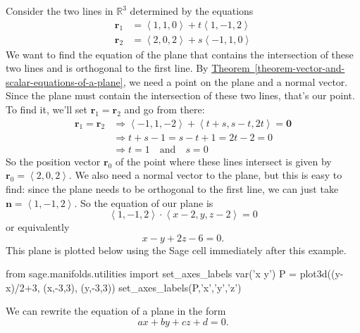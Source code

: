 \documentclass[10pt,]{book}
\theoremstyle{ptxplainnotitle}
\theoremstyle{ptxplaintitle}
\theoremstyle{ptxplainnotitle}
\theoremstyle{ptxplaintitle}
\theoremstyle{ptxplainnotitle}
\theoremstyle{ptxplaintitle}
\theoremstyle{ptxdefinitionnotitle}
\theoremstyle{ptxdefinitiontitle}
\theoremstyle{ptxdefinitionnotitle}
\theoremstyle{ptxdefinitiontitle}
\theoremstyle{ptxdefinitionnotitle}
\theoremstyle{ptxdefinitiontitle}
\theoremstyle{ptxdefinitionnotitle}
\theoremstyle{ptxdefinitiontitle}
\theoremstyle{ptxdefinitionnotitle}
\theoremstyle{ptxdefinitiontitle}
\numberwithin{equation}{section}
\newcommand{\RR}{\mathbb{R}}
\newcommand{\vv}[1]{\mathbf{#1}}
\newcommand{\dotprod}[1]{\left\langle #1 \right\rangle}
\begin{document}
\begin{example}\label{example-equation-of-a-plane-ortho}
\hypertarget{p-878}{}%
Consider the two lines in \(\RR^{3}\) determined by the equations%
%
\begin{align*}
\vv{r}_{1} & = \dotprod{1,1,0} + t\dotprod{1,-1,2} \\
\vv{r}_{2} & = \dotprod{2,0,2} + s\dotprod{-1,1,0} 
\end{align*}
\hypertarget{p-879}{}%
We want to find the equation of the plane that contains the intersection of these two lines and is orthogonal to the first line. By \hyperref[theorem-vector-and-scalar-equations-of-a-plane]{Theorem~\ref{theorem-vector-and-scalar-equations-of-a-plane}}, we need a point on the plane and a normal vector. Since the plane must contain the intersection of these two lines, that's our point. To find it, we'll set \(\vv{r}_{1} = \vv{r}_{2}\) and go from there:%
%
\begin{align*}
\vv{r}_{1}=\vv{r}_{2} & \Rightarrow \dotprod{-1,1,-2} + \dotprod{t+s,s-t,2t} = \vv{0} \\
& \Rightarrow t+s-1 = s-t+1 = 2t-2 = 0 \\
& \Rightarrow t = 1\quad\text{and}\quad s=0 
\end{align*}
\hypertarget{p-880}{}%
So the position vector \(\vv{r}_{0}\) of the point where these lines intersect is given by \(\vv{r}_{0} = \dotprod{2,0,2}\). We also need a normal vector to the plane, but this is easy to find: since the plane needs to be orthogonal to the first line, we can just take \(\vv{n} = \dotprod{1,-1,2}\). So the equation of our plane is%
%
\begin{equation*}
\dotprod{1,-1,2}\cdot\dotprod{x-2,y,z-2} = 0
\end{equation*}
\hypertarget{p-881}{}%
or equivalently%
%
\begin{equation*}
x-y+2z -6 = 0.
\end{equation*}
\hypertarget{p-882}{}%
This plane is plotted below using the Sage cell immediately after this example.%
\end{example}
\begin{sageinput}
from sage.manifolds.utilities import set_axes_labels
var('x y')
P = plot3d((y-x)/2+3, (x,-3,3), (y,-3,3)) 
set_axes_labels(P,'x','y','z')
\end{sageinput}
\hypertarget{p-883}{}%
We can rewrite the equation of a plane in the form%
%
\begin{equation*}
ax+by+cz+d = 0.
\end{equation*}
\end{document}
